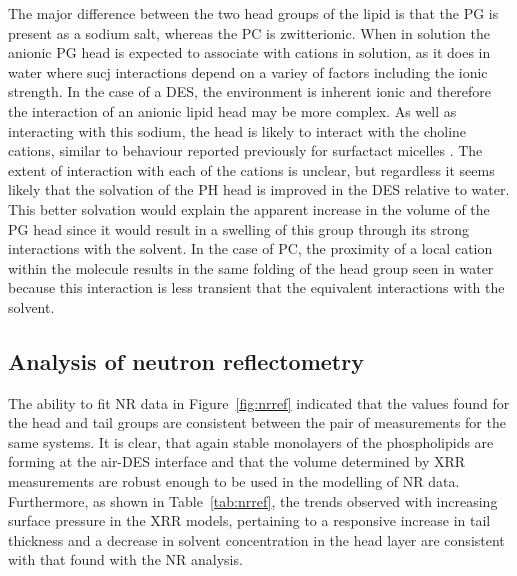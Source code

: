 The major difference between the two head groups of the lipid is that the PG is present as a sodium salt, whereas the PC is zwitterionic.
When in solution the anionic PG head is expected to associate with cations in solution, as it does in water \cite{grigoriev_effect_1999} where sucj interactions depend on a variey of factors including the ionic strength.
In the case of a DES, the environment is inherent ionic and therefore the interaction of an anionic lipid head may be more complex.
As well as interacting with this sodium, the head is likely to interact with the choline cations, similar to behaviour reported previously for surfactact micelles \cite{sanchez-fernandez_counterion_2018}.
The extent of interaction with each of the cations is unclear, but regardless it seems likely that the solvation of the PH head is improved in the DES relative to water.
This better solvation would explain the apparent increase in the volume of the PG head since it would result in a swelling of this group through its strong interactions with the solvent.
In the case of PC, the proximity of a local cation within the molecule results in the same folding of the head group seen in water because this interaction is less transient that the equivalent interactions with the solvent. 

\subsection{Analysis of neutron reflectometry}
The ability to fit NR data in Figure~\ref{fig:nrref} indicated that the values found for the head and tail groups are consistent between the pair of measurements for the same systems.
It is clear, that again stable monolayers of the phospholipids are forming at the air-DES interface and that the volume determined by XRR measurements are robust enough to be used in the modelling of NR data.
Furthermore, as shown in Table~\ref{tab:nrref}, the trends observed with increasing surface pressure in the XRR models, pertaining to a responsive increase in tail thickness and a decrease in solvent concentration in the head layer are consistent with that found with the NR analysis.

